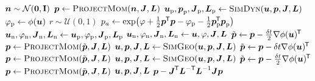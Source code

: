 \begin{multicols}{2}
\small
\begin{algorithmic}[1]
\algrenewcommand\algorithmicindent{1.0em}
    \State $\vct{n} \sim \nrm{\vct{0},\mathbf{I}}$
    \State $\vct{p} \gets \Call{ProjectMom}{\vct{n},\mtx{J},\mtx{L}}$
    \State $\vct{u}_{\mathrm{p}},\vct{p}_{\mathrm{p}},\mtx{J}_{\mathrm{p}},\mtx{L}_{\mathrm{p}} \gets \Call{SimDyn}{\vct{u},\vct{p},\mtx{J},\mtx{L}}$
    \State $\varphi_{\mathrm{p}} \gets \phi(\boldsymbol{u})$
    \State $r \sim \mathcal{U}(0,1)$
    \State $p_a \gets \exp\lpa \varphi + \frac{1}{2}\vct{p}\tr\vct{p} - \varphi_{\mathrm{p}} - \frac{1}{2}\vct{p}_{\mathrm{p}}\tr\vct{p}_{\mathrm{p}} \rpa$
        \State $\boldsymbol{u}_{\mathrm{n}},\varphi_{\textrm{n}},\boldsymbol{J}_{\mathrm{n}},\boldsymbol{L}_{\mathrm{n}} 
        \gets \boldsymbol{u}_{\mathrm{p}},\varphi_{\mathrm{p}},\boldsymbol{J}_{\mathrm{p}},\boldsymbol{L}_{\mathrm{p}}$
    \Else
        \State $\boldsymbol{u}_{\mathrm{n}},\varphi_{\mathrm{n}},\boldsymbol{J}_{\mathrm{n}},\boldsymbol{L}_{\mathrm{n}} 
        \gets \boldsymbol{u},\varphi,\boldsymbol{J},\boldsymbol{L}$
    \EndIf
    \State %
        \State $\tilde{\boldsymbol{p}} \gets \boldsymbol{p} - \frac{\delta t}{2} \nabla\phi({\boldsymbol{u}})^{\mkern-1.5mu\mathsf{T}}$
        \vspace{0.5mm}
        \State $\vct{p} \gets \Call{ProjectMom}{\tilde{\vct{p}},\mtx{J},\mtx{L}}$
        \State $\vct{u},\vct{p},\mtx{J},\mtx{L} \gets \Call{SimGeo}{\vct{u},\vct{p},\mtx{J},\mtx{L}}$
            \State $\tilde{\boldsymbol{p}} \gets \boldsymbol{p} - \delta t \nabla\phi({\boldsymbol{u}})^{\mkern-1.5mu\mathsf{T}}$
            \vspace{0.5mm}
            \State $\vct{p} \gets \Call{ProjectMom}{\tilde{\vct{p}},\mtx{J},\mtx{L}}$
            \State $\vct{u},\vct{p},\mtx{J},\mtx{L} \gets \Call{SimGeo}{\vct{u},\vct{p},\mtx{J},\mtx{L}}$
        \EndFor
        \State $\tilde{\boldsymbol{p}}\gets \boldsymbol{p} - \frac{\delta t}{2} \nabla\phi({\boldsymbol{u}})^{\mkern-1.5mu\mathsf{T}}$
        \vspace{0.5mm}
        \State $\vct{p} \gets \Call{ProjectMom}{\tilde{\vct{p}},\mtx{J},\mtx{L}}$
        \State \Return $\boldsymbol{u},\boldsymbol{p},\boldsymbol{J},\boldsymbol{L}$
    \EndFunction
    \State %
        \State \Return $\boldsymbol{p} - \boldsymbol{J}^{\mkern-1.5mu\mathsf{T}}\boldsymbol{L}^{-\textsf{T}}\boldsymbol{L}^{-1}\boldsymbol{J}\boldsymbol{p}$
    \EndFunction
    \columnbreak

\end{algorithmic}
\end{multicols}
